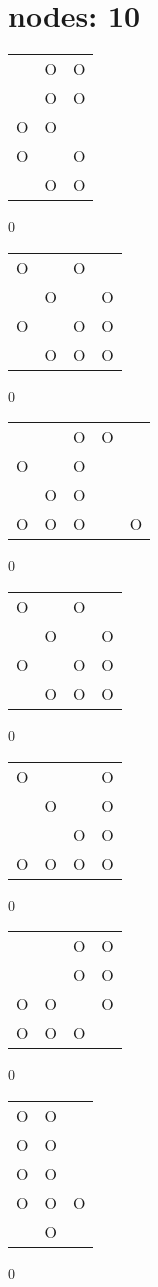 \section{nodes: 10}
\begin{tabular}{|m{0.2cm}m{0.2cm}m{0.2cm}|}\hline
 &O&O\\
 &O&O\\
O&O& \\
O& &O\\
 &O&O\\
\hline\end{tabular}0
\begin{tabular}{|m{0.2cm}m{0.2cm}m{0.2cm}m{0.2cm}|}\hline
O& &O& \\
 &O& &O\\
O& &O&O\\
 &O&O&O\\
\hline\end{tabular}0
\begin{tabular}{|m{0.2cm}m{0.2cm}m{0.2cm}m{0.2cm}m{0.2cm}|}\hline
 & &O&O& \\
O& &O& & \\
 &O&O& & \\
O&O&O& &O\\
\hline\end{tabular}0
\begin{tabular}{|m{0.2cm}m{0.2cm}m{0.2cm}m{0.2cm}|}\hline
O& &O& \\
 &O& &O\\
O& &O&O\\
 &O&O&O\\
\hline\end{tabular}0
\begin{tabular}{|m{0.2cm}m{0.2cm}m{0.2cm}m{0.2cm}|}\hline
O& & &O\\
 &O& &O\\
 & &O&O\\
O&O&O&O\\
\hline\end{tabular}0
\begin{tabular}{|m{0.2cm}m{0.2cm}m{0.2cm}m{0.2cm}|}\hline
 & &O&O\\
 & &O&O\\
O&O& &O\\
O&O&O& \\
\hline\end{tabular}0
\begin{tabular}{|m{0.2cm}m{0.2cm}m{0.2cm}|}\hline
O&O& \\
O&O& \\
O&O& \\
O&O&O\\
 &O& \\
\hline\end{tabular}0
